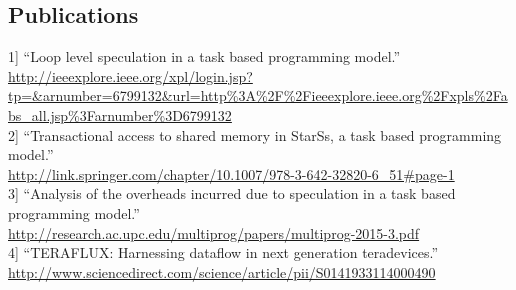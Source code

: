 \documentclass[margin]{res}
\begin{document}
\begin{resume}
\section{Publications}
%
1] \enquote{Loop level speculation in a task based programming model.} \\
        \url{http://ieeexplore.ieee.org/xpl/login.jsp?tp=&arnumber=6799132&url=http\%3A\%2F\%2Fieeexplore.ieee.org\%2Fxpls\%2Fabs\_all.jsp\%3Farnumber\%3D6799132}\\
%
2] \enquote{Transactional access to shared memory in StarSs, a task based programming model.} \\
        \url{http://link.springer.com/chapter/10.1007/978-3-642-32820-6\_51#page-1} \\
%
3] \enquote{Analysis of the overheads incurred due to speculation in a task based programming model.} \\
        \url{http://research.ac.upc.edu/multiprog/papers/multiprog-2015-3.pdf} \\
%
4] \enquote{TERAFLUX: Harnessing dataflow in next generation teradevices.} \\
        \url{http://www.sciencedirect.com/science/article/pii/S0141933114000490} \\
%
%
%

\end{resume}
\end{document}

